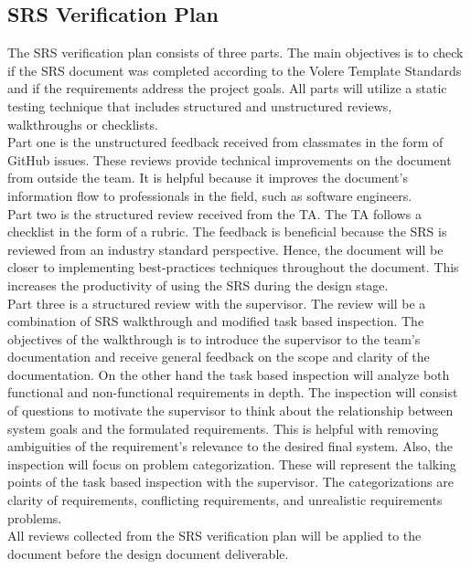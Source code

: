 \documentclass[12pt, titlepage]{article}
\begin{document}
\subsection{SRS Verification Plan}

The SRS verification plan consists of three parts. The main objectives is to check
if the SRS document was completed according to the Volere Template Standards and 
if the requirements address the project goals. All parts will utilize a static 
testing technique that includes structured and unstructured reviews, walkthroughs or checklists.\\
Part one is the unstructured feedback received from 
classmates in the form of GitHub issues. These reviews provide technical
improvements on the document from outside the team. It is helpful because it 
improves the document's information flow to  professionals in the
field, such as software engineers.\\ 
Part two is the structured review received from the TA. The TA follows a checklist in the form of a rubric. The feedback is beneficial because the SRS is reviewed
from an industry standard perspective. Hence, the document will be
closer to implementing best-practices techniques throughout the
document. This increases the productivity of using the SRS during the
design stage.\\ 
Part three is a structured review with the supervisor. The review will be a
combination of SRS walkthrough and modified task based inspection. 
The objectives of the walkthrough is to introduce the supervisor to the 
team's documentation and receive general feedback on the scope and 
clarity of the documentation. On the other hand the task based 
inspection will analyze both functional and non-functional
requirements in depth. The inspection will consist of questions to 
motivate the supervisor to think about the relationship between 
system goals and the formulated requirements. This is helpful with 
removing ambiguities of the requirement's relevance to the desired final system. 
Also, the inspection will focus on problem categorization.
These will represent the talking points of the task based inspection with the supervisor.
The categorizations are clarity of requirements, conflicting requirements, and unrealistic requirements problems. \\
All reviews collected from the SRS verification plan will be applied
to the document before the design document deliverable.
\end{document}
